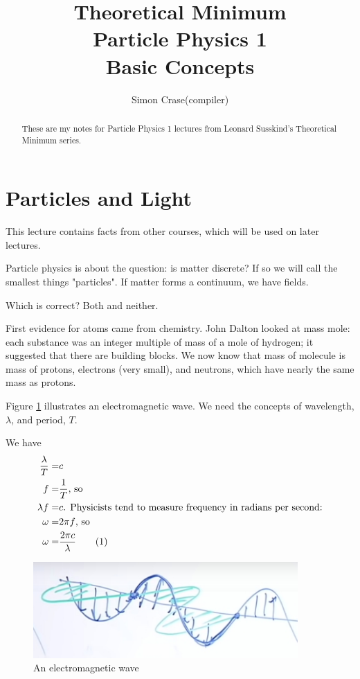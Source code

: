 \documentclass[]{article}
\title{Theoretical Minimum\\Particle Physics 1\\Basic Concepts}
\author{Simon Crase(compiler)}
\newcommand\numberthis{\addtocounter{equation}{1}\tag{\theequation}}
\begin{document}
\maketitle

\begin{abstract}
These are my notes for Particle Physics 1 lectures from Leonard Susskind's Theoretical Minimum series.
\end{abstract}

\tableofcontents
\listoffigures

\section{Particles and Light}

This lecture contains  facts from other courses, which will be used on later lectures.

Particle physics is about the question: is matter discrete? If so we will call the smallest things "particles". If matter forms a continuum, we have fields.

Which is correct? Both and neither.

First evidence for atoms came from chemistry. John Dalton looked at mass mole: each substance was an integer multiple of mass of a mole of hydrogen; it suggested that there are building blocks. We now know that mass of molecule is mass of protons, electrons (very small), and neutrons, which have nearly the same mass as protons. 
 
Figure \ref{fig:em:wave} illustrates an electromagnetic wave. We need the concepts of wavelength, $\lambda$, and period, $T$.

We have
\begin{align*}
\frac{\lambda}{T}=&c\\
f=&\frac{1}{T} \text{, so}\\
\lambda f =& c\text{. Physicists tend to measure frequency in radians per second:}\\
\omega =& 2 \pi f \text{, so} \\
\omega =& \frac{2 \pi c}{\lambda} \numberthis \label{eq:omega:lambda}
\end{align*}

\begin{figure}[H]
	\caption{An electromagnetic wave}\label{fig:em:wave}  
	\includegraphics[width=0.9\textwidth]{Wavelength}
\end{figure}
\end{document}
